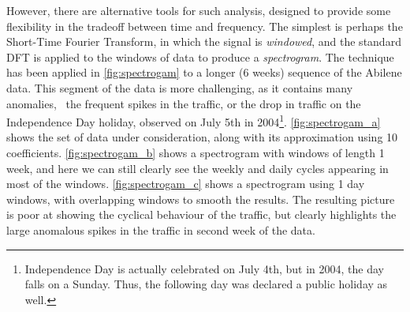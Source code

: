 However, there are alternative tools for such analysis, designed to
provide some flexibility in the tradeoff between time and
frequency. The simplest is perhaps the Short-Time Fourier Transform,
in which the signal is {\em windowed}, and the standard DFT is applied
to the windows of data to produce a {\em spectrogram}. The technique
has been applied in \autoref{fig:spectrogam} to a longer (6
weeks) sequence of the Abilene data. This segment of the data is more
challenging, as it contains many anomalies, \eg~the frequent spikes
in the traffic, or the drop in traffic on the Independence Day holiday,
observed on July 5th in 2004\footnote{Independence Day is actually 
celebrated on July 4th, but in 2004, the day falls on a Sunday. Thus, the following
day was declared a public holiday as well.}. \autoref{fig:spectrogam_a} shows the
set of data under consideration, along with its approximation using 10
coefficients. \autoref{fig:spectrogam_b} shows a spectrogram with
windows of length 1 week, and here we can still clearly see the weekly
and daily cycles appearing in most of the
windows. \autoref{fig:spectrogam_c} shows a spectrogram using 1 day
windows, with overlapping windows to smooth the results. The resulting
picture is poor at showing the cyclical behaviour of the traffic, but
clearly highlights the large anomalous spikes in the traffic in second
week of the data. 

